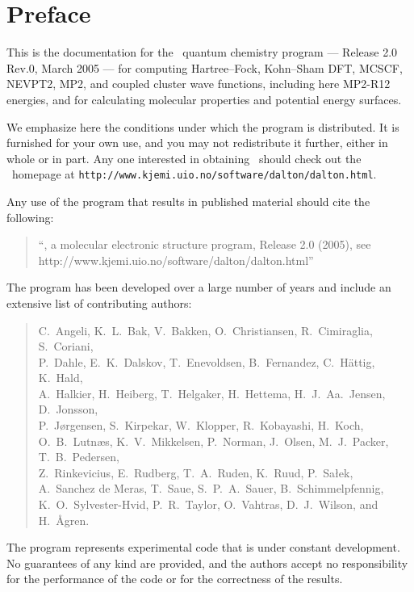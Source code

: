 \tableofcontents

\chapter*{Preface}

This is the documentation for the \dalton\ quantum chemistry program
--- Release 2.0 Rev.0, March 2005 --- for computing Hartree--Fock, Kohn--Sham DFT, 
MCSCF, NEVPT2,  MP2, and coupled cluster wave functions, including here MP2-R12 energies, and for calculating 
molecular properties and potential energy surfaces.

          We emphasize here the conditions under which the
program is distributed.  It is furnished for your own use,
and you may not redistribute it further, either in whole or in
part.  Any one interested in obtaining \dalton\ should check out the
\dalton\ homepage at
\verb|http://www.kjemi.uio.no/software/dalton/dalton.html|.

Any use of the program that results in published
material should cite the following:
\begin{quote}
``\dalton , a molecular electronic  structure program, Release
2.0 (2005), see http://www.kjemi.uio.no/software/dalton/dalton.html''
\end{quote}

The program has been developed over a large number of years and
include an extensive list of contributing authors:

\begin{quote}
C.~Angeli,
K.~L.~Bak,
V.~Bakken,
O.~Christiansen,
R.~Cimiraglia,
S.~Coriani,\\
P.~Dahle,
E.~K.~Dalskov,
T.~Enevoldsen,
B.~Fernandez,
C.~H{\"a}ttig,
K.~Hald,\\
A.~Halkier,
H.~Heiberg,
T.~Helgaker,
H.~Hettema,
H.~J.~Aa.~Jensen,
D.~Jonsson,\\
P.~J{\o}rgensen,
S.~Kirpekar,
W.~Klopper,
R.~Kobayashi,
H.~Koch,
O.~B.~Lutn\ae s,
K.~V.~Mikkelsen,
P.~Norman,
J.~Olsen,
M.~J.~Packer,
T.~B.~Pedersen,\\
Z.~Rinkevicius,
E.~Rudberg,
T.~A.~Ruden,
K.~Ruud,
P.~Sa\l ek,\\
A.~Sanchez de Meras,
T.~Saue,
S.~P.~A.~Sauer,
B.~Schimmelpfennig,\\
K.~O.~Sylvester-Hvid,
P.~R.~Taylor,
O.~Vahtras,
D.~J.~Wilson,
and H.~{\AA}gren.
\end{quote}

          The program represents experimental code that is
under constant development.  No guarantees of any kind are
provided, and the authors accept no responsibility for the
performance of the code or for the correctness of the results.
